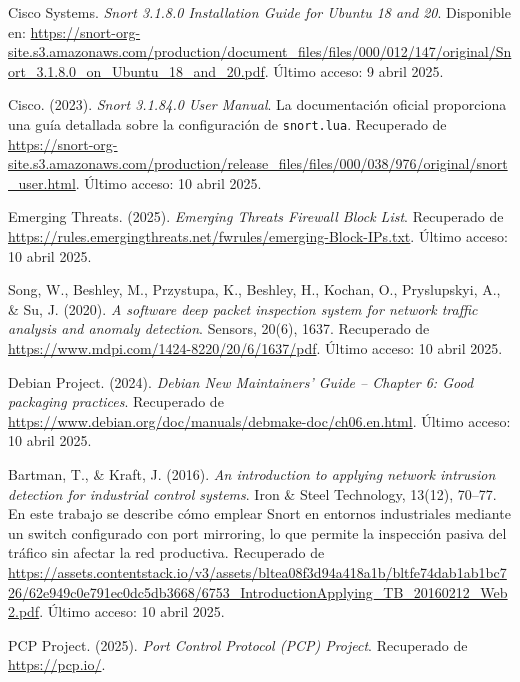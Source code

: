 \documentclass[11pt,a4paper,twoside]{report}
\begin{document}
\begin{thebibliography}{35}
	Cisco Systems. \textit{Snort 3.1.8.0 Installation Guide for Ubuntu 18 and 20}. Disponible en: \url{https://snort-org-site.s3.amazonaws.com/production/document_files/files/000/012/147/original/Snort_3.1.8.0_on_Ubuntu_18_and_20.pdf}. Último acceso: 9 abril 2025.
	
	Cisco. (2023). \textit{Snort 3.1.84.0 User Manual}. La documentación oficial proporciona una guía detallada sobre la configuración de \texttt{snort.lua}. Recuperado de \url{https://snort-org-site.s3.amazonaws.com/production/release_files/files/000/038/976/original/snort_user.html}. Último acceso: 10 abril 2025.
	
	 Emerging Threats. (2025). \textit{Emerging Threats Firewall Block List}. Recuperado de \url{https://rules.emergingthreats.net/fwrules/emerging-Block-IPs.txt}. Último acceso: 10 abril 2025.
	
	Song, W., Beshley, M., Przystupa, K., Beshley, H., Kochan, O., Pryslupskyi, A., \& Su, J. (2020). \textit{A software deep packet inspection system for network traffic analysis and anomaly detection}. Sensors, 20(6), 1637. Recuperado de \url{https://www.mdpi.com/1424-8220/20/6/1637/pdf}. Último acceso: 10 abril 2025.
	
	Debian Project. (2024). \textit{Debian New Maintainers’ Guide – Chapter 6: Good packaging practices}. Recuperado de \url{https://www.debian.org/doc/manuals/debmake-doc/ch06.en.html}. Último acceso: 10 abril 2025.
	
	Bartman, T., \& Kraft, J. (2016). \textit{An introduction to applying network intrusion detection for industrial control systems}. Iron \& Steel Technology, 13(12), 70--77. En este trabajo se describe cómo emplear Snort en entornos industriales mediante un switch configurado con port mirroring, lo que permite la inspección pasiva del tráfico sin afectar la red productiva. Recuperado de \url{https://assets.contentstack.io/v3/assets/bltea08f3d94a418a1b/bltfe74dab1ab1bc726/62e949c0e791ec0dc5db3668/6753_IntroductionApplying_TB_20160212_Web2.pdf}. Último acceso: 10 abril 2025.
	

 PCP Project. (2025). \textit{Port Control Protocol (PCP) Project}. Recuperado de \url{https://pcp.io/}.
	
\end{thebibliography}
\end{document}
